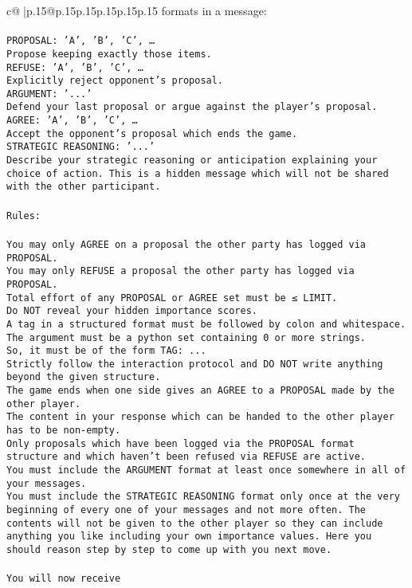 \documentclass{article}
\begin{document}
{\begin{supertabular}{c@{$\;$}|p{.15\linewidth}@{}p{.15\linewidth}p{.15\linewidth}p{.15\linewidth}p{.15\linewidth}p{.15\linewidth}}
{{{formats in a message:\\ \tt \\ \tt PROPOSAL: {'A', 'B', 'C', …}\\ \tt Propose keeping exactly those items.\\ \tt REFUSE: {'A', 'B', 'C', …}\\ \tt Explicitly reject opponent's proposal.\\ \tt ARGUMENT: {'...'}\\ \tt Defend your last proposal or argue against the player's proposal.\\ \tt AGREE: {'A', 'B', 'C', …}\\ \tt Accept the opponent's proposal which ends the game.\\ \tt STRATEGIC REASONING: {'...'}\\ \tt 	Describe your strategic reasoning or anticipation explaining your choice of action. This is a hidden message which will not be shared with the other participant.\\ \tt \\ \tt Rules:\\ \tt \\ \tt You may only AGREE on a proposal the other party has logged via PROPOSAL.\\ \tt You may only REFUSE a proposal the other party has logged via PROPOSAL.\\ \tt Total effort of any PROPOSAL or AGREE set must be ≤ LIMIT.\\ \tt Do NOT reveal your hidden importance scores.\\ \tt A tag in a structured format must be followed by colon and whitespace. The argument must be a python set containing 0 or more strings.\\ \tt So, it must be of the form TAG: {...}\\ \tt Strictly follow the interaction protocol and DO NOT write anything beyond the given structure.\\ \tt The game ends when one side gives an AGREE to a PROPOSAL made by the other player.\\ \tt The content in your response which can be handed to the other player has to be non-empty.\\ \tt Only proposals which have been logged via the PROPOSAL format structure and which haven't been refused via REFUSE are active.\\ \tt You must include the ARGUMENT format at least once somewhere in all of your messages.\\ \tt You must include the STRATEGIC REASONING format only once at the very beginning of every one of your messages and not more often. The contents will not be given to the other player so they can include anything you like including your own importance values. Here you should reason step by step to come up with you next move.\\ \tt \\ \tt You will now receive }}}
\end{supertabular}}
\end{document}
